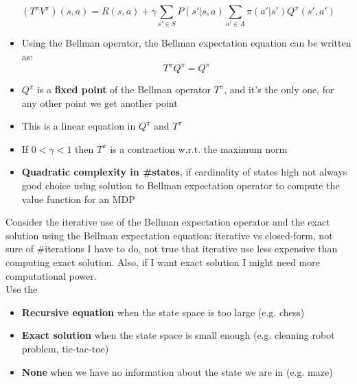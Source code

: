     $$(T^\pi V^\pi)(s,a)=R(s,a)+\gamma\sum_{s' \in S}P(s'|s,a)\sum_{a' \in A}\pi(a'|s')Q^\pi(s',a')$$
    \begin{itemize}
        \item Using the Bellman operator, the Bellman expectation equation can be written as:
        $$T^\pi Q^\pi=Q^\pi$$
        \item $Q^\pi$ is a \textbf{fixed point} of the Bellman operator $T^\pi$, and it's the only one, for any other point we get another point
        \item This is a linear equation in $Q^\pi$ and $T^\pi$
        \item If $0 < \gamma < 1$ then $T^\pi$ is a contraction w.r.t. the maximum norm
        \item \textbf{Quadratic complexity in \#states}, if cardinality of states high not always good choice using solution to Bellman expectation operator to compute the value function for an MDP
    \end{itemize}
    Consider the iterative use of the Bellman expectation operator and the exact solution using the Bellman expectation equation: iterative vs closed-form, not sure of \#iterations I have to do, not true that iterative use less expensive than computing exact solution. Also, if I want exact solution I might need more computational power.\\
    Use the
    \begin{itemize}
        \item \textbf{Recursive equation} when the state space is too large (e.g. chess)
        \item \textbf{Exact solution} when the state space is small enough (e.g. cleaning robot problem, tic-tac-toe)
        \item \textbf{None} when we have no information about the state we are in (e.g. maze)
    \end{itemize}
